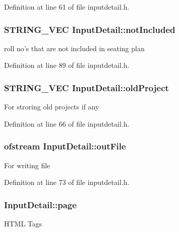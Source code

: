 Definition at line 61 of file inputdetail.\-h.

\hypertarget{classInputDetail_aba862d64d7f84a385e528d0daf42e9fc}{
\subsubsection[{not\-Included}]{\setlength{\rightskip}{0pt plus 5cm}S\-T\-R\-I\-N\-G\-\_\-\-V\-E\-C Input\-Detail\-::not\-Included\hspace{0.3cm}{\ttfamily [protected]}}}\label{classInputDetail_aba862d64d7f84a385e528d0daf42e9fc}
roll no's that are not included in seating plan 

Definition at line 89 of file inputdetail.\-h.

\hypertarget{classInputDetail_ae8ccc2e838c6d5a93ea544370dc1f272}{
\subsubsection[{old\-Project}]{\setlength{\rightskip}{0pt plus 5cm}S\-T\-R\-I\-N\-G\-\_\-\-V\-E\-C Input\-Detail\-::old\-Project\hspace{0.3cm}{\ttfamily [protected]}}}\label{classInputDetail_ae8ccc2e838c6d5a93ea544370dc1f272}
For stroring old projects if any 

Definition at line 66 of file inputdetail.\-h.

\hypertarget{classInputDetail_a2b8484cfbfee98ae69e8476f8fd40000}{
\subsubsection[{out\-File}]{\setlength{\rightskip}{0pt plus 5cm}ofstream Input\-Detail\-::out\-File\hspace{0.3cm}{\ttfamily [protected]}}}\label{classInputDetail_a2b8484cfbfee98ae69e8476f8fd40000}
For writing file 

Definition at line 73 of file inputdetail.\-h.

\hypertarget{classInputDetail_ae487757aaafba4ac372c327e2b7a9673}{
\subsubsection[{page}]{ Input\-Detail\-::page\hspace{0.3cm}{\ttfamily [protected]}}}\label{classInputDetail_ae487757aaafba4ac372c327e2b7a9673}
H\-T\-M\-L Tags 

